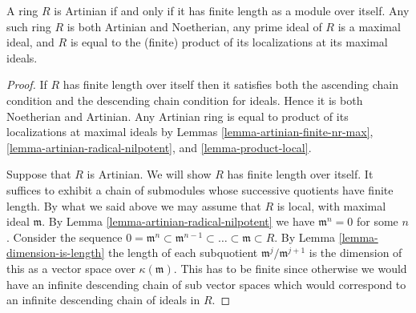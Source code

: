\begin{lemma}
\label{lemma-artinian-finite-length}
A ring $R$ is Artinian if and only if it has finite length
as a module over itself. Any such ring $R$ is both Artinian and
Noetherian, any prime ideal of $R$ is a maximal ideal, and $R$ is equal
to the (finite) product of its localizations at its maximal ideals.
\end{lemma}

\begin{proof}
If $R$ has finite length over itself then it satisfies both
the ascending chain condition and the descending chain
condition for ideals. Hence it is both Noetherian and Artinian.
Any Artinian ring is equal to product of its localizations
at maximal ideals by Lemmas \ref{lemma-artinian-finite-nr-max},
\ref{lemma-artinian-radical-nilpotent}, and \ref{lemma-product-local}.

\medskip\noindent
Suppose that $R$ is Artinian. We will show $R$ has finite
length over itself. It suffices to exhibit a chain of
submodules whose successive quotients have finite length.
By what we said above
we may assume that $R$ is local, with maximal ideal $\mathfrak m$.
By Lemma \ref{lemma-artinian-radical-nilpotent} we have
$\mathfrak m^n =0$ for some $n$.
Consider the sequence
$0 = \mathfrak m^n \subset \mathfrak m^{n-1} \subset
\ldots \subset \mathfrak m \subset R$. By Lemma
\ref{lemma-dimension-is-length} the length of each subquotient
$\mathfrak m^j/\mathfrak m^{j + 1}$ is the dimension of this
as a vector space over $\kappa(\mathfrak m)$. This has to be
finite since otherwise we would have an infinite descending
chain of sub vector spaces which would correspond to an
infinite descending chain of ideals in $R$.
\end{proof}